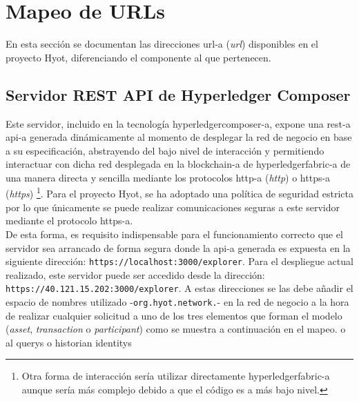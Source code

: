 \documentclass[12pt,a4paper, twoside]{report}
\begin{document}
	\section{Mapeo de URLs}
	
	En esta sección se documentan las direcciones \gls{url-a} (\textit{\gls{url}}) disponibles en el proyecto Hyot, diferenciando el componente al que pertenecen. \\
		
	\subsection{Servidor REST API de Hyperledger Composer}
	
	Este servidor, incluido en la tecnología \gls{hyperledgercomposer-a}, expone una \gls{rest-a} \gls{api-a} generada dinámicamente al momento de desplegar la red de negocio en base a su especificación, abstrayendo del bajo nivel de interacción y permitiendo interactuar con dicha red desplegada en la \gls{blockchain-a} de \gls{hyperledgerfabric-a} de una manera directa y sencilla mediante los protocolos \gls{http-a} (\textit{\gls{http}}) o \gls{https-a} (\textit{\gls{https}}) \footnote{Otra forma de interacción sería utilizar directamente \gls{hyperledgerfabric-a} aunque sería más complejo debido a que el código es a más bajo nivel.}. Para el proyecto Hyot, se ha adoptado una política de seguridad estricta por lo que únicamente se puede realizar comunicaciones seguras a este servidor mediante el protocolo \gls{https-a}. \\
	
	De esta forma, es requisito indispensable para el funcionamiento correcto que el servidor sea arrancado de forma segura donde la \gls{api-a} generada es expuesta en la siguiente dirección: \texttt{https://localhost:3000/explorer}. Para el despliegue actual realizado, este servidor puede ser accedido desde la dirección: \texttt{https://40.121.15.202:3000/explorer}. A estas direcciones se las debe añadir el espacio de nombres utilizado -\texttt{org.hyot.network.}- en la red de negocio a la hora de realizar cualquier solicitud a uno de los tres elementos que forman el modelo (\textit{\gls{asset}}, \textit{\gls{transaction}} o \textit{\gls{participant}}) como se muestra a continuación en el mapeo. 
		o al \Glspl{query}
		o \gls{historian}
		\glspl{identity}
	 
\end{document}
